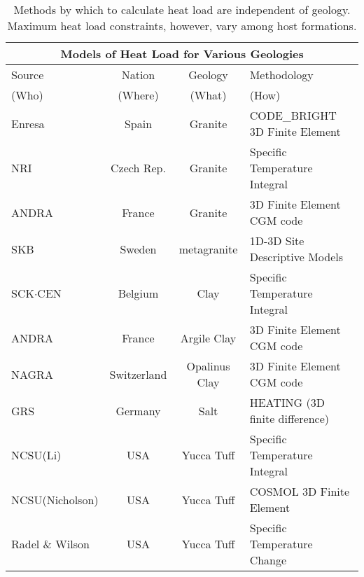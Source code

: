  \begin{table}[h!]
    \centering
    \footnotesize{
    \begin{tabular}{|l|c|c|l|}
      \multicolumn{4}{c}{\textbf{Models of Heat Load for Various Geologies}}\\
      \hline
      Source & Nation & Geology & Methodology \\  
      (Who) & (Where) & (What) & (How) \\  
      \hline
      Enresa \cite{von_lensa_red-impact_2008}           & Spain       & Granite       &  CODE\_BRIGHT 3D Finite Element \\ 
      NRI   \cite{von_lensa_red-impact_2008}            & Czech Rep.  & Granite       &  Specific Temperature Integral   \\
      ANDRA \cite{andra_granite:_2005}                  & France      & Granite       &  3D Finite Element CGM code   \\
      SKB \cite{ab_long-term_2006}                      & Sweden      & metagranite   &  1D-3D Site  Descriptive Models \\
      SCK$\cdot$CEN   \cite{von_lensa_red-impact_2008}  & Belgium     & Clay          &  Specific Temperature Integral   \\ 
      ANDRA \cite{andra_argile:_2005}                   & France      & Argile Clay   &  3D Finite Element CGM code   \\
      NAGRA \cite{johnson_project_2002, johnson_calculations_2002}  & Switzerland  & Opalinus Clay &  3D Finite Element CGM code \\
      GRS \cite{von_lensa_red-impact_2008}              & Germany     & Salt          &  HEATING (3D finite difference)   \\ 
      NCSU(Li)   \cite{li_examining_2007}               & USA         & Yucca Tuff    &  Specific Temperature Integral \\        
      NCSU(Nicholson) \cite{nicholson_thermal_2007}     & USA         & Yucca Tuff    &  COSMOL 3D Finite Element\\
      Radel \& Wilson \cite{radel_repository_2007}      & USA         & Yucca Tuff    &  Specific Temperature Change \\ 
      \hline
    \end{tabular}
    \caption[International heat transport modeling methods in various geologies.]{Methods by which to calculate heat 
    load are independent of geology. Maximum heat load constraints, however, vary among host formations. }
    \label{tab:heat}
    }
  \end{table}
